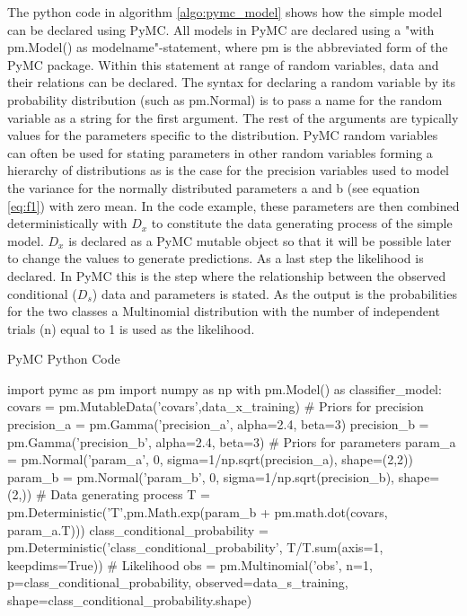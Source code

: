 \documentclass[a4paper,11pt, oneside]{article}
\theoremstyle{definition}
\begin{document}
	The python code in algorithm \ref{algo:pymc_model} shows how the simple model can be declared using PyMC. All models in PyMC are declared using a "with pm.Model() as modelname"-statement, where pm is the abbreviated form of the PyMC package. Within this statement at range of random variables, data and their relations can be declared. The syntax for declaring a random variable by its probability distribution (such as pm.Normal) is to pass a name for the random variable as a string for the first argument. The rest of the arguments are typically values for the parameters specific to the distribution. PyMC random variables can often be used for stating parameters in other random variables forming a hierarchy of distributions as is the case for the precision variables used to model the variance for the normally distributed parameters a and b (see equation \ref{eq:f1}) with zero mean. In the code example, these parameters are then combined deterministically with $D_x$ to constitute the data generating process of the simple model. $D_x$ is declared as a PyMC mutable object so that it will be possible later to change the values to generate predictions. As a last step the likelihood is declared. In PyMC this is the step where the relationship between the observed conditional ($D_s$) data and parameters is stated. As the output is the probabilities for the two classes a Multinomial distribution with the number of independent trials (n) equal to 1 is used as the likelihood. 
	
	\begin{algorithm}[H]
		\label{algo:pymc_model}
		\caption{PyMC Python Code}
		\begin{python}
			import pymc as pm
			import numpy as np
			with pm.Model() as classifier_model:
			covars = pm.MutableData('covars',data_x_training) 
			# Priors for precision
			precision_a = pm.Gamma('precision_a', alpha=2.4, beta=3)
			precision_b = pm.Gamma('precision_b', alpha=2.4, beta=3)
			# Priors for parameters
			param_a = pm.Normal('param_a', 
			0, 
			sigma=1/np.sqrt(precision_a),
			shape=(2,2))
			param_b = pm.Normal('param_b', 
			0, 
			sigma=1/np.sqrt(precision_b),
			shape=(2,))
			# Data generating process
			T = pm.Deterministic('T',pm.Math.exp(param_b + pm.math.dot(covars, param_a.T)))
			class_conditional_probability = pm.Deterministic('class_conditional_probability', T/T.sum(axis=1, keepdims=True))
			# Likelihood
			obs = pm.Multinomial('obs', n=1, p=class_conditional_probability, observed=data_s_training, shape=class_conditional_probability.shape)
		\end{python}
	\end{algorithm}
	       
\end{document}

